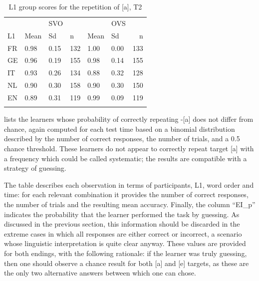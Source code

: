 \begin{table}
    \begin{tabularx}{\textwidth}{XXXXXXr}
    \lsptoprule
    &  & {SVO} && & {OVS} &\\
    L1 & Mean & Sd & n & Mean & Sd & n\\
    \midrule
    FR & 0.98 & 0.15 & 132 & 1.00 & 0.00 & 133\\
    GE & 0.96 & 0.19 & 155 & 0.98 & 0.14 & 155\\
    IT & 0.93 & 0.26 & 134 & 0.88 & 0.32 & 128\\
    NL & 0.90 & 0.30 & 158 & 0.90 & 0.30 & 150\\
    EN & 0.89 & 0.31 & 119 & 0.99 & 0.09 & 119\\
    \lspbottomrule
    \end{tabularx}
    \caption{L1 group scores for the repetition of [a], T2}
    \label{tab:04:8}
\end{table}

 lists the learners whose probability of correctly repeating -[a] does not differ from chance, again computed for each test time based on a binomial distribution described by the number of correct responses, the number of trials, and a 0.5 chance threshold. These learners do not appear to correctly repeat target [a] with a frequency which could be called systematic; the results are compatible with a strategy of guessing.

The table describes each observation in terms of participants, L1, word order and time: for each relevant combination it provides the number of correct responses, the number of trials and the resulting mean accuracy. Finally, the column “EI\_p” indicates the probability that the learner performed the task by guessing. As discussed in the previous section, this information should be discarded in the extreme cases in which all responses are either correct or incorrect, a scenario whose linguistic interpretation is quite clear anyway. These values are provided for both endings, with the following rationale: if the learner was truly guessing, then one should observe a chance result for both [a] and [e] targets, as these are the only two alternative answers between which one can chose.

